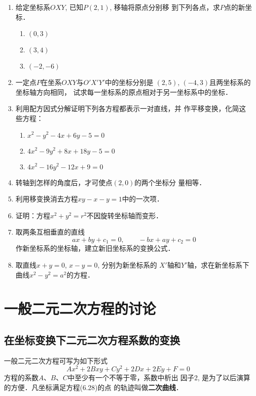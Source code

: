 \begin{enumerate}
    \item 给定坐标系$OXY$, 已知$P(2,1)$, 移轴将原点分别移
    到下列各点，求$P$点的新坐标．
\begin{multicols}{3}
    \begin{enumerate}
        \item $(0,3)$
        \item $(3,4)$
        \item $(-2,-6)$
    \end{enumerate}
\end{multicols}

    \item 一定点$P$在坐系$OXY$与$O'X'Y'$中的坐标分别是
    $(2,5)$, $(-4,3)$且两坐标系的坐标轴方向相同，
    试求每一坐标系的原点相对于另一坐标系中的坐标．
    \item 利用配方因式分解证明下列各方程都表示一对直线，并
    作平移变换，化简这些方程：
\begin{enumerate}
\item $x^2-y^2-4x+6y-5=0$
\item $4x^2-9y^2+8x+18y-5=0$
\item $4x^2-16y^2-12x+9=0$
\end{enumerate}

    \item 转轴到怎样的角度后，才可使点$(2,0)$的两个坐标分
    量相等．
    \item 利用移变换消去方程$xy-x-y=1$中的一次项．
    \item 证明：方程$x^2+y^2=r^2$不因旋转坐标轴而变形．
    \item 取两条互相垂直的直线
  \[  ax+by+c_1=0,\qquad -bx+ay+c_2=0\]
    作新坐标系的坐标轴，建立新旧坐标系的变换公式．
    \item 取直线$x+y=0$, $x-y=0$, 分别为新坐标系的
    $X'$轴和$Y'$轴，求在新坐标系下曲线$x^2-y^2=a^2$的方程．
\end{enumerate}

\section{一般二元二次方程的讨论}
\subsection{在坐标变换下二元二次方程系数的变换}
一般二元二次方程可写为如下形式
\begin{equation}
    Ax^2+2Bxy+Cy^2+2Dx+2Ey+F=0
\end{equation}
方程的系数$A$、$B$、$C$中至少有一个不等于零，系数中析出
因子2, 是为了以后演算的方便．凡坐标满足方程(6.28)的点
的轨迹叫做\textbf{二次曲线}．

